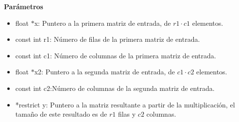 \begin{enumerate}
\begin{lstlisting}
\end{lstlisting}

\textbf{Parámetros}

\begin{itemize}
    \item float $*$x:  Puntero a la primera matriz de entrada, de $r1 \cdot c1$ elementos.
    \item const int r1: Número de filas de la primera matriz de entrada.
    \item const int c1: Número de columnas de la primera matriz de entrada.

    \item float $*$x2: Puntero a la segunda  matriz de entrada, de $c1 \cdot c2$ elementos.
    \item const int c2:Número de columnas de la segunda matriz de entrada.
    
     \item *restrict y: Puntero a la matriz resultante a partir de la multiplicación, el tamaño de este resultado es de $r1$ filas y $c2$ columnas.
\end{itemize}


\end{enumerate}